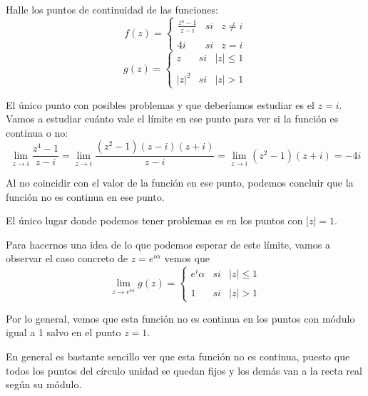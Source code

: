 \begin{problem}[6]
Halle los puntos de continuidad de las funciones:
\ppart
\[f(z)=\left\{
\begin{array}{lcc}
    \frac{z^4-1}{z-i}& si & z \neq i \\
 \\ 4i & si & z=i
 \end{array} \right.\]
\ppart
\[g(z)=\left\{
\begin{array}{lcc}
    z & si & |z| \leq 1 \\
 \\ |z|^2 & si & |z| > 1
 \end{array} \right.\]

 \solution
\spart
El único punto con posibles problemas y que deberíamos estudiar es el $z=i$. Vamos a estudiar cuánto vale el límite en ese punto para ver si la función es continua o no:
\[\lim_{z \to i} \frac{z^4 -1}{z-i}=\lim_{z \to i}\frac{(z^2-1)(z-i)(z+i)}{z-i} = \lim_{z \to i} (z^2-1)(z+i) = -4i\]

Al no coincidir con el valor de la función en ese punto, podemos concluir que la función no es continua en ese punto.

\spart
El único lugar donde podemos tener problemas es en los puntos con $[z|=1$.

Para hacernos una idea de lo que podemos esperar de este límite, vamos a observar el caso concreto de $z=e^{iα}$ vemos que
\[\lim_{z \to e^{iα}} g(z) =\left\{
\begin{array}{lcc}
    e^iα & si & |z| \leq 1 \\
 \\ 1 & si & |z| > 1
 \end{array} \right. \]

 Por lo general, vemos que esta función no es continua en los puntos con módulo igual a 1 salvo en el punto $z=1$.

 En general es bastante sencillo ver que esta función no es continua, puesto que todos los puntos del círculo unidad se quedan fijos y los demás van a la recta real según su módulo.

\end{problem}


